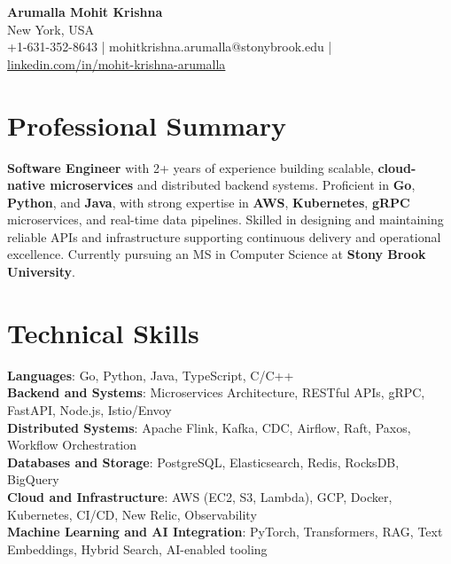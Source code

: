 \documentclass[letterpaper,11pt]{article}
\begin{document}
\begin{center}
  {\Large \textbf{Arumalla Mohit Krishna}} \\
  New York, USA \\
  +1-631-352-8643 \enspace | \enspace mohitkrishna.arumalla@stonybrook.edu \enspace | \enspace \href{https://www.linkedin.com/in/mohit-krishna-arumalla}{linkedin.com/in/mohit-krishna-arumalla}
\end{center}

\section{Professional Summary}
  \begin{itemize}[leftmargin=0.15in, label={}]
    \small{\item{
     \textbf{Software Engineer} with 2+ years of experience building scalable, \textbf{cloud-native microservices} and distributed backend systems. Proficient in \textbf{Go}, \textbf{Python}, and \textbf{Java}, with strong expertise in \textbf{AWS}, \textbf{Kubernetes}, \textbf{gRPC} microservices, and real-time data pipelines. Skilled in designing and maintaining reliable APIs and infrastructure supporting continuous delivery and operational excellence. Currently pursuing an MS in Computer Science at \textbf{Stony Brook University}.
    }}
  \end{itemize}
\vspace{-16pt}

\section{Technical Skills}
 \begin{itemize}[leftmargin=0.15in, label={}]
    \small{\item{
     \textbf{Languages}: Go, Python, Java, TypeScript, C/C++ \\
     \textbf{Backend and Systems}: Microservices Architecture, RESTful APIs, gRPC, FastAPI, Node.js, Istio/Envoy \\
     \textbf{Distributed Systems}: Apache Flink, Kafka, CDC, Airflow, Raft, Paxos, Workflow Orchestration \\
     \textbf{Databases and Storage}: PostgreSQL, Elasticsearch, Redis, RocksDB, BigQuery \\
     \textbf{Cloud and Infrastructure}: AWS (EC2, S3, Lambda), GCP, Docker, Kubernetes, CI/CD, New Relic, Observability \\
     \textbf{Machine Learning and AI Integration}: PyTorch, Transformers, RAG, Text Embeddings, Hybrid Search, AI-enabled tooling
    }}
 \end{itemize}
\vspace{-16pt}
\end{document}
